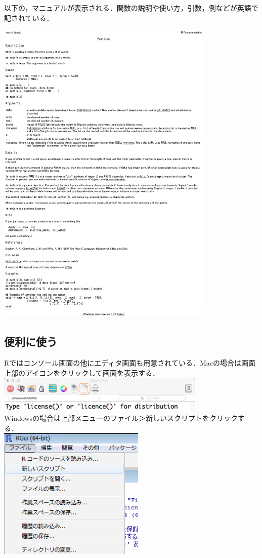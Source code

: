 以下の，マニュアルが表示される．関数の説明や使い方，引数，例などが英語で記されている．
\begin{center}
\includegraphics[height=15cm]{img/matrices.eps}
\end{center}

\subsection{便利に使う}
Rではコンソール画面の他にエディタ画面も用意されている．Macの場合は画面上部のアイコンをクリックして画面を表示する．\\
\includegraphics[width=10cm]{img/maceditor.eps}\\
Windowsの場合は上部メニューのファイル＞新しいスクリプトをクリックする．\\
\includegraphics[width=7cm]{img/wineditor.eps}

